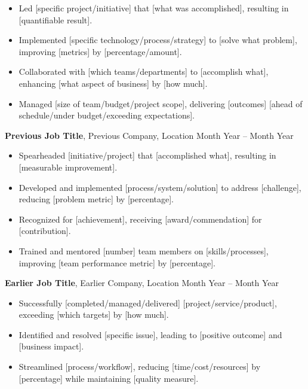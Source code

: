 \documentclass[a4paper,10pt]{article}
\begin{document}
\begin{itemize}
    \item Led [specific project/initiative] that [what was accomplished], resulting in [quantifiable result].
    
    \item Implemented [specific technology/process/strategy] to [solve what problem], improving [metrics] by [percentage/amount].
    
    \item Collaborated with [which teams/departments] to [accomplish what], enhancing [what aspect of business] by [how much].
    
    \item Managed [size of team/budget/project scope], delivering [outcomes] [ahead of schedule/under budget/exceeding expectations].
\end{itemize}

\vspace{4pt}
{\bfseries Previous Job Title}, Previous Company, Location \hfill Month Year -- Month Year

\begin{itemize}
    \item Spearheaded [initiative/project] that [accomplished what], resulting in [measurable improvement].
    
    \item Developed and implemented [process/system/solution] to address [challenge], reducing [problem metric] by [percentage].
    
    \item Recognized for [achievement], receiving [award/commendation] for [contribution].
    
    \item Trained and mentored [number] team members on [skills/processes], improving [team performance metric] by [percentage].
\end{itemize}

\vspace{4pt}
{\bfseries Earlier Job Title}, Earlier Company, Location \hfill Month Year -- Month Year

\begin{itemize}
    \item Successfully [completed/managed/delivered] [project/service/product], exceeding [which targets] by [how much].
    
    \item Identified and resolved [specific issue], leading to [positive outcome] and [business impact].
    
    \item Streamlined [process/workflow], reducing [time/cost/resources] by [percentage] while maintaining [quality measure].
\end{itemize}
\end{document}
